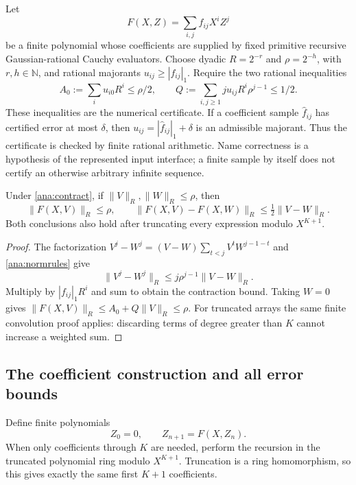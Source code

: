 Let
\[
 F(X,Z)=\sum_{i,j} f_{ij}X^iZ^j
\]
be a finite polynomial whose coefficients are supplied by fixed primitive
recursive Gaussian-rational Cauchy evaluators.  Choose dyadic
$R=2^{-r}$ and $\rho=2^{-h}$, with $r,h\in\mathbb N$, and rational
majorants $u_{ij}\ge |f_{ij}|_1$.  Require the two rational inequalities
\begin{equation}
 A_0:=\sum_i u_{i0}R^i\le\rho/2,
 \qquad
 Q:=\sum_{i,j\ge1}j u_{ij}R^i\rho^{j-1}\le1/2.
 \label{ana:contract}
\end{equation}
These inequalities are the numerical certificate.  If a coefficient sample
$\widehat f_{ij}$ has certified error at most $\delta$, then
$u_{ij}=|\widehat f_{ij}|_1+\delta$ is an admissible majorant.  Thus the
certificate is checked by finite rational arithmetic.  Name correctness
is a hypothesis of the represented input interface; a finite sample by
itself does not certify an otherwise arbitrary infinite sequence.

\begin{lemma}
\label{ana:contraction}
Under \eqref{ana:contract}, if $\lVert V\rVert_R,\lVert W\rVert_R\le\rho$,
then
\[
 \lVert F(X,V)\rVert_R\le\rho,
 \qquad
 \lVert F(X,V)-F(X,W)\rVert_R\le\tfrac12\lVert V-W\rVert_R.
\]
Both conclusions also hold after truncating every expression modulo
$X^{K+1}$.
\end{lemma}

\begin{proof}
The factorization
$V^j-W^j=(V-W)\sum_{t<j}V^tW^{j-1-t}$ and
\eqref{ana:normrules} give
\[
 \lVert V^j-W^j\rVert_R
 \le j\rho^{j-1}\lVert V-W\rVert_R.
\]
Multiply by $|f_{ij}|_1R^i$ and sum to obtain the contraction bound.
Taking $W=0$ gives
$\lVert F(X,V)\rVert_R\le A_0+Q\lVert V\rVert_R\le\rho$.
For truncated arrays the same finite convolution proof applies: discarding
terms of degree greater than $K$ cannot increase a weighted sum.
\end{proof}

\subsection{The coefficient construction and all error bounds}

Define finite polynomials
\[
 Z_0=0,\qquad Z_{n+1}=F(X,Z_n).
\]
When only coefficients through $K$ are needed, perform the recursion in
the truncated polynomial ring modulo $X^{K+1}$.  Truncation is a ring
homomorphism, so this gives exactly the same first $K+1$ coefficients.

